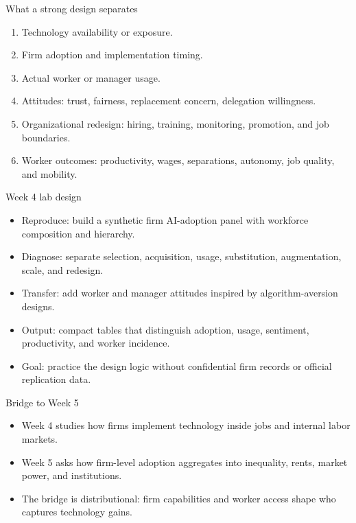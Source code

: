 \documentclass[aspectratio=169,11pt]{beamer}
\begin{document}
\begin{frame}{What a strong design separates}
\begin{enumerate}
    \item Technology availability or exposure.
    \item Firm adoption and implementation timing.
    \item Actual worker or manager usage.
    \item Attitudes: trust, fairness, replacement concern, delegation willingness.
    \item Organizational redesign: hiring, training, monitoring, promotion, and job boundaries.
    \item Worker outcomes: productivity, wages, separations, autonomy, job quality, and mobility.
\end{enumerate}
\end{frame}

\begin{frame}{Week 4 lab design}
\begin{itemize}
    \item Reproduce: build a synthetic firm AI-adoption panel with workforce composition and hierarchy.
    \item Diagnose: separate selection, acquisition, usage, substitution, augmentation, scale, and redesign.
    \item Transfer: add worker and manager attitudes inspired by algorithm-aversion designs.
    \item Output: compact tables that distinguish adoption, usage, sentiment, productivity, and worker incidence.
    \item Goal: practice the design logic without confidential firm records or official replication data.
\end{itemize}
\end{frame}

\begin{frame}{Bridge to Week 5}
\begin{itemize}
    \item Week 4 studies how firms implement technology inside jobs and internal labor markets.
    \item Week 5 asks how firm-level adoption aggregates into inequality, rents, market power, and institutions.
    \item The bridge is distributional: firm capabilities and worker access shape who captures technology gains.
\end{itemize}
\end{frame}
\end{document}
